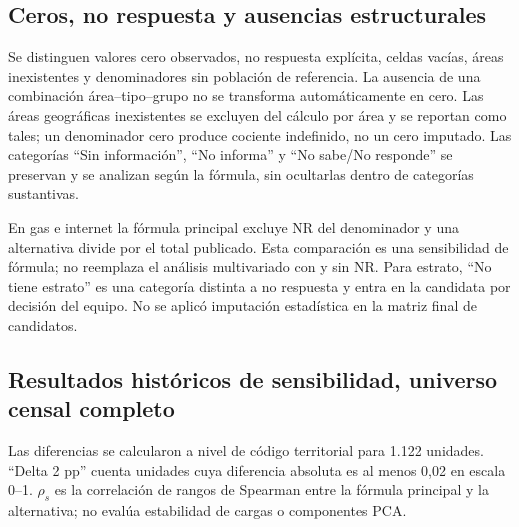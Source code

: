 \subsection{Ceros, no respuesta y ausencias estructurales}

Se distinguen valores cero observados, no respuesta explícita, celdas vacías, áreas inexistentes y denominadores sin población de referencia. La ausencia de una combinación área--tipo--grupo no se transforma automáticamente en cero. Las áreas geográficas inexistentes se excluyen del cálculo por área y se reportan como tales; un denominador cero produce cociente indefinido, no un cero imputado. Las categorías \enquote{Sin información}, \enquote{No informa} y \enquote{No sabe/No responde} se preservan y se analizan según la fórmula, sin ocultarlas dentro de categorías sustantivas.

En gas e internet la fórmula principal excluye NR del denominador y una alternativa divide por el total publicado. Esta comparación es una sensibilidad de fórmula; no reemplaza el análisis multivariado con y sin NR. Para estrato, \enquote{No tiene estrato} es una categoría distinta a no respuesta y entra en la candidata por decisión del equipo. No se aplicó imputación estadística en la matriz final de candidatos.

\subsection{Resultados históricos de sensibilidad, universo censal completo}

Las diferencias se calcularon a nivel de código territorial para 1.122 unidades. \enquote{Delta 2 pp} cuenta unidades cuya diferencia absoluta es al menos 0,02 en escala 0--1. $\rho_s$ es la correlación de rangos de Spearman entre la fórmula principal y la alternativa; no evalúa estabilidad de cargas o componentes PCA.


